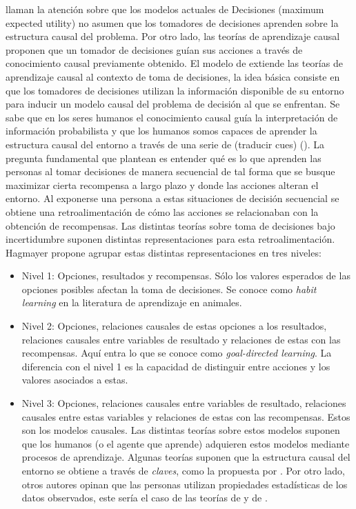 \documentclass[11pt]{article}
\theoremstyle{plain}
\begin{document}
\cite{hagmayer2013hierarchical} llaman la atención sobre que los modelos actuales de Decisiones (maximum expected utility) no asumen que los tomadores de decisiones aprenden sobre la estructura causal del problema. Por otro lado, las teorías de aprendizaje causal proponen que un tomador de decisiones guían sus acciones a través de conocimiento causal previamente obtenido. El modelo de \cite{sloman2006causal} extiende las teorías de aprendizaje causal al contexto de toma de decisiones, la idea básica consiste en que los tomadores de decisiones utilizan la información disponible de su entorno para inducir un modelo causal del problema de decisión al que se enfrentan. Se sabe que en los seres humanos el conocimiento causal guía la interpretación de información probabilista y que los humanos somos capaces de aprender la estructura causal del entorno a través de una serie de (traducir cues) (\cite{lagnado2007beyond}). La pregunta fundamental que plantean \cite{hagmayer2008causal} es entender qué es lo que aprenden las personas al tomar decisiones de manera secuencial de tal forma que se busque maximizar cierta recompensa a largo plazo y donde las acciones alteran el entorno. Al exponerse una persona a estas situaciones de decisión secuencial se obtiene una retroalimentación de cómo las acciones se relacionaban con la obtención de recompensas. Las distintas teorías sobre toma de decisiones bajo incertidumbre suponen distintas representaciones para esta retroalimentación. Hagmayer propone agrupar estas distintas representaciones en tres niveles:
\begin{itemize}
\item Nivel 1: Opciones, resultados y recompensas. Sólo los valores esperados de las opciones posibles afectan la toma de decisiones. Se conoce como \textit{habit learning} en la literatura de aprendizaje en animales.
\item Nivel 2: Opciones, relaciones causales de estas opciones a los resultados, relaciones causales entre variables de resultado y relaciones de estas con las recompensas.  Aquí entra lo que se conoce como \textit{goal-directed learning}. La diferencia con el nivel 1 es la capacidad de distinguir entre acciones y los valores asociados a estas.
\item Nivel 3: Opciones, relaciones causales entre variables de resultado, relaciones causales entre estas variables y relaciones de estas con las recompensas. Estos son los modelos causales. Las distintas teorías sobre estos modelos suponen que los humanos (o el agente que aprende) adquieren estos modelos mediante procesos de aprendizaje. Algunas teorías suponen que la estructura causal del entorno se obtiene a través de \textit{claves}, como la propuesta por \cite{lagnado2007beyond}. Por otro lado, otros autores opinan que las personas utilizan propiedades estadísticas de los datos observados, este sería el caso de las teorías de \cite{gopnik2004theory} y de \cite{griffiths2005structure}.
\end{itemize}
\end{document}
